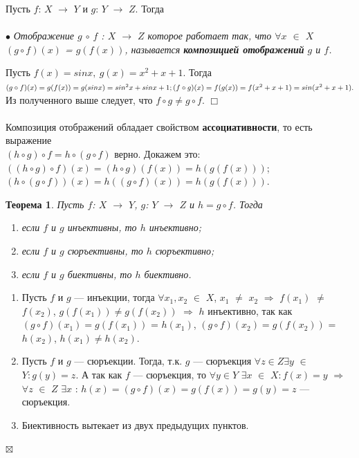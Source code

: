 \documentclass[a4paper, 12pt]{report}
\newenvironment{Proof} %
{\par\noindent{$\blacklozenge$}} %
{\hfill$\scriptstyle\boxtimes$}
\newenvironment{examp} %
{\par\noindent{\textbf{\textsc{Пример:}}}} %
{\hfill$\scriptstyle\Box$}
\begin{document}
	Пусть $f$: $X$ $\rightarrow$ $Y$ и $g$: $Y$ $\rightarrow$ $Z$. Тогда\\\\
	$\bullet$ \textit{Отображение $g$ $\circ$ $f$ : $X$ $\rightarrow$ $Z$ которое работает так, что $\forall x$ $\in$ $X$ $(g \circ f)(x)$ = $g(f(x))$, называется \textbf{композицией отображений} $g$ и $f$.}\\
	\begin{examp} Пусть $f(x) = sinx,\ g(x) = x^2 + x + 1$. Тогда\\
		$(g\circ f)(x) = g(f(x)) = g(sinx) = sin^2 x + sinx + 1;\\
		(f\circ g)(x) =f(g(x)) = f(x^2 + x + 1) = sin(x^2 + x + 1).$\\
		Из полученного выше следует, что $f\circ g \not= g\circ f$.
	\end{examp}\\\\
	Композиция отображений обладает свойством \textbf{ассоциативности}, то есть выражение \\$(h\circ g)\circ f = h\circ (g\circ f)$ верно. Докажем это:\\
	$((h\circ g)\circ f)(x) = (h\circ g)(f(x)) = h(g(f(x)))$;\\
	$(h\circ(g\circ f))(x) = h((g\circ f)(x)) = h(g(f(x)))$.
	\newtheorem*{t6_2}{Теорема}\begin{t6_2} Пусть $f$: $X$ $\rightarrow$ $Y$, $g$: $Y$ $\rightarrow$ $Z$ и $h = g \circ f$. Тогда
		\begin{enumerate}
			\item если $f$ и $g$ инъективны, то $h$ инъективно;
			\item если $f$ и $g$ сюръективны, то $h$ сюръективно;
			\item если $f$ и $g$ биективны, то $h$ биективно.
		\end{enumerate}
	\end{t6_2} \begin{Proof} \begin{enumerate}
			\item Пусть $f$ и $g$ --- инъекции, тогда $\forall x_1, x_2$ $\in$ $X$, $x_1$ $\not=$ $x_2$ $\Rightarrow$ $f(x_1)$ $\not=$ $f(x_2)$, $g(f(x_1)) \not= g(f(x_2))$ $\Rightarrow$ $h$ инъективно, так как $(g\circ f)(x_1) = g(f(x_1))$ = $h(x_1)$, $(g\circ f)(x_2) = g(f(x_2))$ = $h(x_2)$, $h(x_1) \not= h(x_2)$.
			\item Пусть $f$ и $g$ --- сюръекции. Тогда, т.к. $g$ --- сюръекция $\forall z \in Z \exists y$ $\in$ $Y : g(y) = z$. А так как $f$ --- сюръекция, то  $\forall y \in Y$ $\exists x$ $\in$ $X : f(x) = y$ $\Rightarrow$ $\forall z$ $\in$ $Z$ $\exists x$ : $h(x) = (g \circ f)(x) = g(f(x)) = g(y) = z$ --- сюръекция.
			\item Биективность вытекает из двух предыдущих пунктов.
	\end{enumerate} \end{Proof}\\
\end{document}
